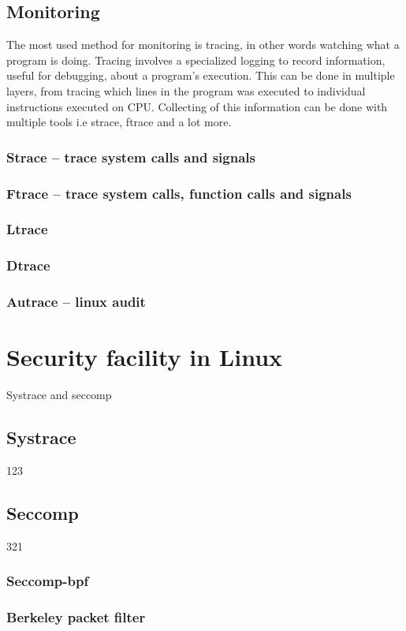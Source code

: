 \section{Monitoring}
The most used method for monitoring is tracing, in other words watching what a program is doing. Tracing involves a specialized logging to record information, useful for debugging, about a program's execution. This can be done in multiple layers, from tracing which lines in the program was executed to individual instructions executed on CPU. Collecting of this information can be done with multiple tools i.e strace, ftrace and a lot more.

\subsection{Strace -- trace system calls and signals}
\subsection{Ftrace -- trace system calls, function calls and signals}
\subsection{Ltrace}
\subsection{Dtrace}
\subsection{Autrace -- linux audit}

\chapter{Security facility in Linux}
Systrace and seccomp\cite{Pravidla}
\section{Systrace}
123

\section{Seccomp}
321
\subsection{Seccomp-bpf}

\subsection{Berkeley packet filter}
